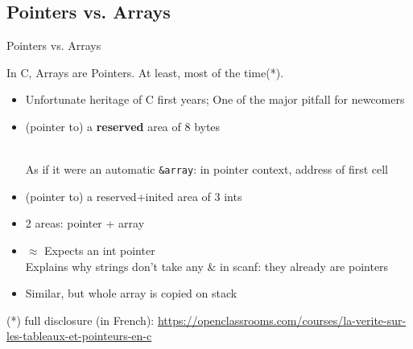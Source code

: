 \begin{Coupe}
\subsection{Pointers vs. Arrays}
\begin{frame}{Pointers vs. Arrays}
  \begin{block}{In C, \alert{Arrays are Pointers}. At least, most of
  the time(*).}
    \begin{itemize}
    \item Unfortunate heritage of C first years; One of the major pitfall for newcomers
    \item {} (pointer to) a \textbf{reserved} area of 8
      bytes
      \\
      As if it were an automatic \texttt{\alert{\&}array}: in pointer
      context, address of first cell
    \item {} (pointer to) a reserved+inited
       area of 3 ints
    \item {} 2 areas: pointer + array

    \medskip
    \item {} $\approx$
        Expects an int pointer \\[2pt]
      Explains why strings don't take any \& in scanf: they already
      are pointers
    \item {} Similar, but whole array is
      copied on stack
    \end{itemize}
  \end{block}
  {\footnotesize (*) full disclosure (in French): \tiny
  \url{https://openclassrooms.com/courses/la-verite-sur-les-tableaux-et-pointeurs-en-c}}


\end{frame}
\end{Coupe}
